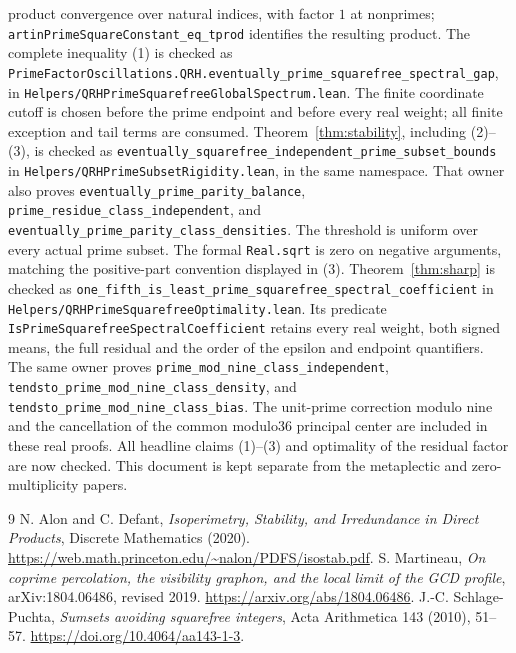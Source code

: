 \documentclass[11pt]{article}
\begin{document}
product convergence over natural indices, with factor \(1\) at nonprimes;
\texttt{artinPrimeSquareConstant\_eq\_tprod} identifies the resulting product.
The complete inequality (1) is checked as
\texttt{PrimeFactorOscillations.QRH.eventually\_prime\_squarefree\_spectral\_gap},
in \texttt{Helpers/QRHPrimeSquarefreeGlobalSpectrum.lean}.
The finite coordinate cutoff is chosen before the prime endpoint and
before every real weight; all finite exception and tail terms are consumed.
Theorem~\ref{thm:stability}, including (2)--(3), is checked as
\texttt{eventually\_squarefree\_independent\_prime\_subset\_bounds}
in \texttt{Helpers/QRHPrimeSubsetRigidity.lean}, in the same namespace.
That owner also proves \texttt{eventually\_prime\_parity\_balance},
\texttt{prime\_residue\_class\_independent}, and
\texttt{eventually\_prime\_parity\_class\_densities}.
The threshold is uniform over every actual prime subset.
The formal \texttt{Real.sqrt} is zero on negative arguments, matching
the positive-part convention displayed in (3).
Theorem~\ref{thm:sharp} is checked as
\texttt{one\_fifth\_is\_least\_prime\_squarefree\_spectral\_coefficient}
in \texttt{Helpers/QRHPrimeSquarefreeOptimality.lean}.
Its predicate \texttt{IsPrimeSquarefreeSpectralCoefficient} retains
every real weight, both signed means, the full residual and the order
of the epsilon and endpoint quantifiers.
The same owner proves \texttt{prime\_mod\_nine\_class\_independent},
\texttt{tendsto\_prime\_mod\_nine\_class\_density}, and
\texttt{tendsto\_prime\_mod\_nine\_class\_bias}.
The unit-prime correction modulo nine and the cancellation of the common
modulo36 principal center are included in these real proofs.
All headline claims (1)--(3) and optimality of the residual factor are now checked.
This document is kept separate from the metaplectic and zero-multiplicity papers.

\begin{thebibliography}{9}
 N. Alon and C. Defant,
\emph{Isoperimetry, Stability, and Irredundance in Direct Products},
Discrete Mathematics (2020).
\url{https://web.math.princeton.edu/~nalon/PDFS/isostab.pdf}.
 S. Martineau,
\emph{On coprime percolation, the visibility graphon, and the local limit
of the GCD profile}, arXiv:1804.06486, revised 2019.
\url{https://arxiv.org/abs/1804.06486}.
 J.-C. Schlage-Puchta,
\emph{Sumsets avoiding squarefree integers},
Acta Arithmetica 143 (2010), 51--57.
\url{https://doi.org/10.4064/aa143-1-3}.
\end{thebibliography}
\end{document}
